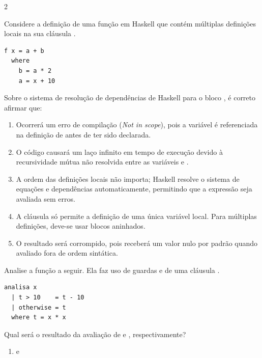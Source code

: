 \documentclass[a4paper,10pt,brazil]{article}
\begin{document}
\begin{multicols}{2}
\begin{enumerate}
\end{enumerate}

Considere a definição de uma função  em Haskell que contém múltiplas definições locais na sua cláusula . 
\begin{verbatim}
f x = a + b
  where
    b = a * 2
    a = x + 10
\end{verbatim}
Sobre o sistema de resolução de dependências de Haskell para o bloco , é correto afirmar que:

\begin{enumerate}
  \item Ocorrerá um erro de compilação (\emph{Not in scope}), pois a variável  é referenciada na definição de  antes de ter sido declarada.

  \item O código causará um laço infinito em tempo de execução devido à recursividade mútua não resolvida entre as variáveis  e .

  \item A ordem das definições locais não importa; Haskell resolve o sistema de equações e dependências automaticamente, permitindo que a expressão seja avaliada sem erros.

  \item A cláusula  só permite a definição de uma única variável local. Para múltiplas definições, deve-se usar blocos  aninhados.

  \item O resultado será corrompido, pois  receberá um valor nulo por padrão quando avaliado fora de ordem sintática.


\end{enumerate}

Analise a função a seguir. Ela faz uso de guardas e de uma cláusula .

\begin{verbatim}
analisa x
  | t > 10    = t - 10
  | otherwise = t
  where t = x * x
\end{verbatim}

Qual será o resultado da avaliação de  e , respectivamente?

\begin{enumerate}
  \item {} e 


\end{enumerate}
\end{multicols}
\end{document}
